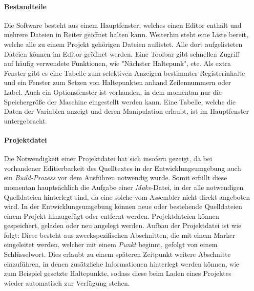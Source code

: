 \paragraph{Bestandteile}
Die Software besteht aus einem Hauptfenster, welches einen Editor enthält und mehrere Dateien in Reiter geöffnet halten kann. Weiterhin steht eine Liste bereit, welche alle zu einem Projekt gehörigen Dateien auflistet. Alle dort aufgelisteten Dateien können im Editor geöffnet werden. Eine Toolbar gibt schnellen Zugriff auf häufig verwendete Funktionen, wie "Nächster Haltepunk", etc.
Als extra Fenster gibt es eine Tabelle zum selektiven Anzeigen bestimmter Registerinhalte und ein Fenster zum Setzen von Haltepunkten anhand Zeilennummern oder Label. Auch ein Optionsfenster ist vorhanden, in dem momentan nur die Speichergröße der Maschine eingestellt werden kann. Eine Tabelle, welche die Daten der Variablen anzeigt und deren Manipulation erlaubt, ist im Hauptfenster untergebracht.

\paragraph{Projektdatei}
Die Notwendigkeit einer Projektdatei hat sich insofern gezeigt, da bei vorhandener Editierbarkeit des Quelltextes in der Entwicklungsumgebung auch ein \emph{Build-Prozess} vor dem Ausführen notwendig wurde. Somit erfüllt diese momentan hauptsächlich die Aufgabe einer \emph{Make}-Datei, in der alle notwendigen Quelldateien hinterlegt sind, da eine solche vom Assembler nicht direkt angeboten wird. In der Entwicklungsumgebung können neue oder bestehende Quelldateien einem Projekt hinzugefügt oder entfernt werden. Projektdateien können gespeichert, geladen oder neu angelegt werden.  Aufbau der Projektdatei ist wie folgt: Diese besteht aus zweckspezifischen Abschnitten, die mit einem Marker eingeleitet werden, welcher mit einem \emph{Punkt} beginnt, gefolgt von einem Schlüsselwort. Dies erlaubt zu einem späteren Zeitpunkt weitere Abschnitte einzuführen, in denen zusätzliche Informationen hinterlegt werden können, wie zum Beispiel gesetzte Haltepunkte, sodass diese beim Laden eines Projektes wieder automatisch zur Verfügung stehen.

